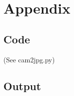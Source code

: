 \documentclass{scrartcl}
\begin{document}
\section{Appendix}


\subsection{Code}
(See cam2jpg.py)


\subsection{Output}









%


\end{document}
